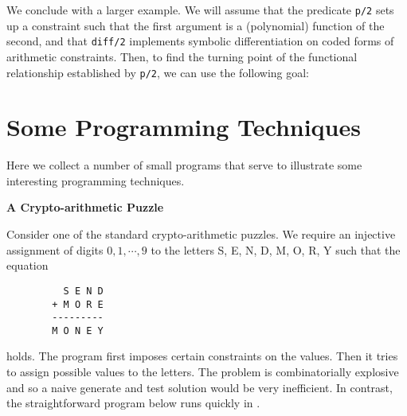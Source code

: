 We conclude with a larger example. 
We will assume that the predicate {\tt p/2} sets
up a constraint such that the first argument is a (polynomial) function of 
the second, and that {\tt diff/2} implements symbolic differentiation on 
coded forms of arithmetic constraints. Then, to find the turning point of 
the functional relationship established by {\tt p/2}, we can use the 
following goal:



\section{Some Programming Techniques}

Here we collect a number of small programs that serve to illustrate
some interesting programming techniques.

\noindent
{\bf A Crypto-arithmetic Puzzle}

Consider one of the
standard crypto-arithmetic puzzles. We require an injective
assignment of digits $0, 1, \cdots , 9$ to
the letters S, E, N, D, M, O, R, Y such that the equation

\begin{verbatim}
          S E N D
        + M O R E
        ---------
        M O N E Y
\end{verbatim}

\noindent
holds. The program first imposes certain constraints on the values. Then
it tries to assign possible values to the letters. The problem is
combinatorially explosive and so a naive generate and test solution 
would be very inefficient.  In contrast, the straightforward
program below runs quickly in \CLPR.

